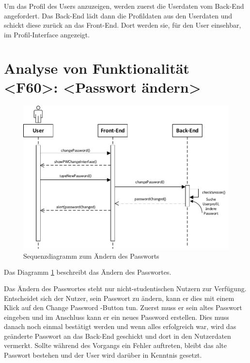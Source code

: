 Um das Profil des Users anzuzeigen, werden zuerst die Userdaten vom Back-End angefordert. Das Back-End lädt dann die Profildaten aus den Userdaten und schickt diese zurück an das Front-End. Dort werden sie, für den User einsehbar, im Profil-Interface angezeigt.


\newpage
\section{Analyse von Funktionalität <F60>: <Passwort ändern>}
\begin{figure}[h]
\centering
\includegraphics[width=1\textwidth]{figures/sequenz_F60.pdf}
\caption{Sequenzdiagramm zum Ändern des Passworts}
\label{sequence_f60}
\end{figure}
Das Diagramm \ref{sequence_f60} beschreibt das Ändern des Passwortes.

Das Ändern des Passwortes steht nur nicht-studentischen Nutzern zur Verfügung.
Entscheidet sich der Nutzer, sein Passwort zu ändern, kann er dies mit einem Klick auf den \glqq Change Password \grqq -Button tun. Zuerst muss er sein altes Passwort eingeben und im Anschluss kann er ein neues Password erstellen. Dies muss danach noch einmal bestätigt werden und wenn alles erfolgreich war, wird das geänderte Passwort an das Back-End geschickt und dort in den Nutzerdaten vermerkt. Sollte während des Vorgangs ein Fehler auftreten, bleibt das alte Passwort bestehen und der User wird darüber in Kenntnis gesetzt.

